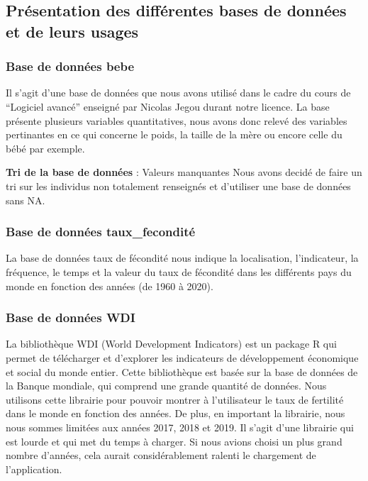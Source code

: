 \documentclass[
]{article}
\begin{document}
\hypertarget{pruxe9sentation-des-diffuxe9rentes-bases-de-donnuxe9es-et-de-leurs-usages}{%
\subsection{Présentation des différentes bases de données et de leurs
usages}\label{pruxe9sentation-des-diffuxe9rentes-bases-de-donnuxe9es-et-de-leurs-usages}}

\hypertarget{base-de-donnuxe9es-bebe}{%
\subsubsection{Base de données bebe}\label{base-de-donnuxe9es-bebe}}

Il s'agit d'une base de données que nous avons utilisé dans le cadre du
cours de ``Logiciel avancé'' enseigné par Nicolas Jegou durant notre
licence. La base présente plusieurs variables quantitatives, nous avons
donc relevé des variables pertinantes en ce qui concerne le poids, la
taille de la mère ou encore celle du bébé par exemple.

\textbf{Tri de la base de données} : Valeurs manquantes \newline Nous
avons decidé de faire un tri sur les individus non totalement renseignés
et d'utiliser une base de données sans NA.

\hypertarget{base-de-donnuxe9es-taux_fecondituxe9}{%
\subsubsection{Base de données
taux\_fecondité}\label{base-de-donnuxe9es-taux_fecondituxe9}}

La base de données taux de fécondité nous indique la localisation,
l'indicateur, la fréquence, le temps et la valeur du taux de fécondité
dans les différents pays du monde en fonction des années (de 1960 à
2020).

\hypertarget{base-de-donnuxe9es-wdi}{%
\subsubsection{Base de données WDI}\label{base-de-donnuxe9es-wdi}}

La bibliothèque WDI (World Development Indicators) est un package R qui
permet de télécharger et d'explorer les indicateurs de développement
économique et social du monde entier. Cette bibliothèque est basée sur
la base de données de la Banque mondiale, qui comprend une grande
quantité de données. Nous utilisons cette librairie pour pouvoir montrer
à l'utilisateur le taux de fertilité dans le monde en fonction des
années. \newline De plus, en important la librairie, nous nous sommes
limitées aux années 2017, 2018 et 2019. Il s'agit d'une librairie qui
est lourde et qui met du temps à charger. Si nous avions choisi un plus
grand nombre d'années, cela aurait considérablement ralenti le
chargement de l'application.
\end{document}
